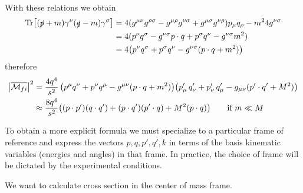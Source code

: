 \documentclass[TheoreticalPhy_ModB.tex]{subfiles}
\begin{document}
\begin{enumerate}[label=(\Roman*)]
\end{enumerate}

With these relations we obtain
	\begin{align*}
	\Tr[(\slashed p + m) \gamma^{\nu}(\slashed q - m) \gamma^{\sigma}]
	& = 4(g^{\mu\nu}g^{\rho\sigma} - g^{\mu\rho}g^{\nu\sigma} + g^{\mu\sigma}g^{\nu\rho}) p_{\mu}q_{\rho} - m^2 4g^{\nu\sigma} \\
	& = 4 (p^{\nu}q^{\sigma} - g^{\nu\sigma}p \cdot q + p^{\sigma}q^{\nu} - g^{\nu\sigma}m^2) \\
	& = 4 \bigl(p^{\nu}q^{\sigma} + p^{\sigma}q^{\nu} - g^{\nu\sigma}(p \cdot q + m^2) \bigr)
	\end{align*}
therefore
	\begin{align*}
	\abs{\overline{\mathcal{M}_{fi}}}^2 
	& = \frac{4q^4}{s^2} \, \bigl( p^{\mu}q^{\nu} + p^{\nu}q^{\mu} - g^{\mu\nu}(p \cdot q + m^2) \bigr)
		\bigl( p'_{\mu}\, q'_{\nu} + p'_{\nu}\, q'_{\mu} - g_{\mu\nu} (p' \cdot q' + M^2) \bigr) \\
	& \approx \frac{8q^4}{s^2} \bigl( (p \cdot p')(q \cdot q') + (p \cdot q')(p' \cdot q) + M^2(p \cdot q) \bigr)
		\qquad \textup{if } m \ll M
	\end{align*}

To obtain a more explicit formula we must specialize to a particular frame of reference and express the vectors $p, q, p', q', k$ in terms of the basis kinematic variables (energies and angles) in that frame. In practice, the choice of frame will be dictated by the experimental conditions.

We want to calculate cross section in the center of mass frame.

\begin{figure}[H]
\centering

\end{figure}
\end{document}
